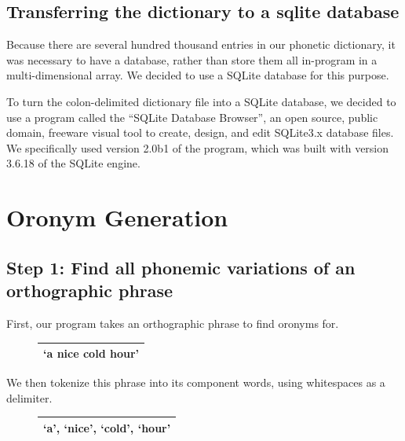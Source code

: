 \subsection{Transferring the dictionary to a sqlite database}
\label{subsection:transferringTheDictionaryToASqliteDatabase}

Because there are several hundred thousand entries in our phonetic dictionary, it was necessary to have a database, rather than store them all in-program in a multi-dimensional array.  We decided to use a SQLite database for this purpose.  

To turn the colon-delimited dictionary file into a SQLite database, we decided to use a program called the “SQLite Database Browser”, an open source, public domain, freeware visual tool to create, design, and edit SQLite3.x database files.  We specifically used version 2.0b1 of the program, which was built with version 3.6.18 of the SQLite engine\cite{sqliteDatabaseBrowser}.

\section{Oronym Generation}
\label{oronymGeneration}

\subsection{Step 1: Find all phonemic variations of an orthographic phrase}
\label{subsection:stepOneFindAllSAMPAphrase}

First, our program takes an orthographic phrase to find oronyms for.

\begin{figure}[h]
\begin{center}
\begin{tabular}{|c|}
\hline
`a nice cold hour' \\
\hline
\end{tabular}
\label{fig:oronymGeneration:orthoPhraseInput}
\end{center}
\end{figure}

We then tokenize this phrase into its component words, using whitespaces as a delimiter. 
\begin{figure}[h]
\begin{center}
\begin{tabular}{|c|}
\hline
`a', `nice', `cold', `hour' \\
\hline
\end{tabular}
\label{fig:oronymGeneration:tokenizedInputOrthoPhraseWords}
\end{center}
\end{figure}


